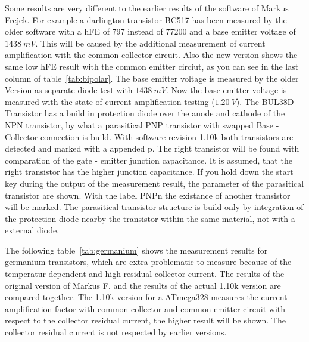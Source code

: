Some results are very different to the earlier results of the software of Markus Frejek.
For example a darlington transistor BC517 has been measured by the older software
with a hFE of 797 instead of 77200 and a base emitter voltage of \(1438~mV\).
This will be caused by the additional measurement of current amplification with the
common collector circuit.
Also the new version shows the same low hFE result with the common emitter circiut,
as you can see in the last column of table~\ref{tab:bipolar}.
The base emitter voltage is measured by the older Version as separate diode test with \(1438~mV\).
Now the base emitter voltage is measured with the state of current amplification testing (\(1.20~V\)).
The BUL38D Transistor has a build in protection diode over the anode and cathode of the NPN transistor,
by what a parasitical PNP transistor with swapped Base - Collector connection is build.
With software revision 1.10k both transistors are detected and marked
with a appended p.
The right transistor will be found with comparation of the gate - emitter junction capacitance.
It is assumed, that the right transistor has the higher junction capacitance.
If you hold down the start key during the output of the measurement result, the parameter of
the parasitical transistor are shown. With the label PNPn the existance of another transistor will be marked.
The parasitical transistor structure is build only by integration of the protection diode nearby
the transistor within the same material, not with a external diode.

The following table~\ref{tab:germanium} shows the measurement results for germanium transistors, which are extra problematic
to measure because of the temperatur dependent and high residual collector current.
The results of the original version of Markus F. and the results of the actual 1.10k version are
compared together. The 1.10k version for a ATmega328 measures the current amplification factor with
common collector and common emitter circuit with respect to the collector residual current,
the higher result will be shown.
The collector residual current is not respected by earlier versions.

